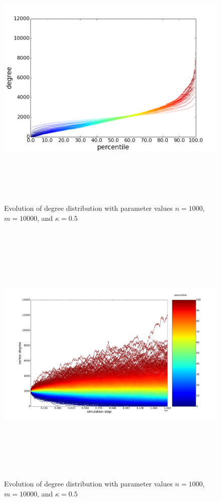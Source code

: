 \documentclass[11pt]{article}
\begin{document}
\begin{figure}[h!]
  \centering
  \includegraphics[height=130mm]{n_1000_long_time}
  \caption{Evolution of degree distribution with parameter values $n=1000$, $m=10000$, and $\kappa=0.5$}
  \label{fig:1000st}
\end{figure}
\begin{figure}[h!]
  \centering
  \includegraphics[height=130mm]{n_1000_long}
  \caption{Evolution of degree distribution with parameter values $n=1000$, $m=10000$, and $\kappa=0.5$}
  \label{fig:1000sv}
\end{figure}




\end{document}
